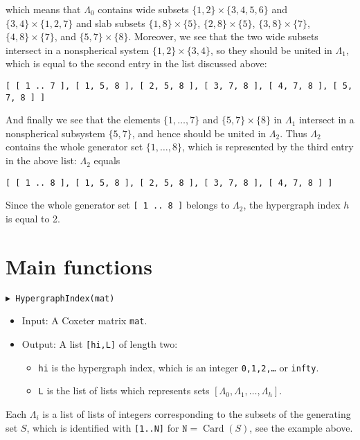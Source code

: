 \documentclass[10pt]{amsart}
\newcommand{\Card}{\operatorname{Card}}
\begin{document}
\noindent
which means that $\Lambda_0$ contains wide subsets $\{1,2\}\times\{3,4,5,6\}$ and $\{3,4\}\times\{1,2,7\}$ and slab subsets $\{1,8\}\times\{5\}$, $\{2,8\}\times\{5\}$, $\{3,8\}\times\{7\}$, $\{4,8\}\times\{7\}$, and $\{5,7\}\times\{8\}$. Moreover, we see that the two wide subsets intersect in a nonspherical system $\{1,2\}\times\{3,4\}$, so they should be united in $\Lambda_1$, which is equal to the second entry in the list discussed above:
\medskip\noindent
{\footnotesize
\begin{verbatim}
[ [ 1 .. 7 ], [ 1, 5, 8 ], [ 2, 5, 8 ], [ 3, 7, 8 ], [ 4, 7, 8 ], [ 5, 7, 8 ] ]
\end{verbatim}}\noindent
And finally we see that the elements $\{1,\dots,7\}$ and $\{5,7\}\times\{8\}$ in $\Lambda_1$ intersect in a nonspherical subsystem $\{5,7\}$, and hence should be united in $\Lambda_2$. Thus $\Lambda_2$ contains the whole generator set $\{1,\dots,8\}$, which is represented by the third entry in the above list: $\Lambda_2$ equals
\medskip\noindent
{\footnotesize
\begin{verbatim}
[ [ 1 .. 8 ], [ 1, 5, 8 ], [ 2, 5, 8 ], [ 3, 7, 8 ], [ 4, 7, 8 ] ] 
\end{verbatim}}\noindent
Since the whole generator set {\tt [ 1 .. 8 ]} belongs to $\Lambda_2$, the hypergraph index $h$ is equal to 2.


\section{Main functions}

\noindent
{\tt $\blacktriangleright$ HypergraphIndex(mat)}

\noindent 
\begin{itemize}
\item{} Input: A Coxeter matrix {\tt mat}.
\item{} Output: A list {\tt [hi,L]} of length two:
\begin{itemize}
\item{} {\tt hi} is the hypergraph index, which is an integer {\tt 0,1,2,\dots} or {\tt infty}.
\item{} {\tt L} is the list of lists which represents sets $[\Lambda_0,\Lambda_1,\dots,\Lambda_h]$.
\end{itemize}
\end{itemize}
Each $\Lambda_i$ is a list of lists of integers corresponding to the subsets of the generating set $S$, which is identified with {\tt [1..N]} for $\mathtt{N}=\Card(S)$, see the example above.
\end{document}
